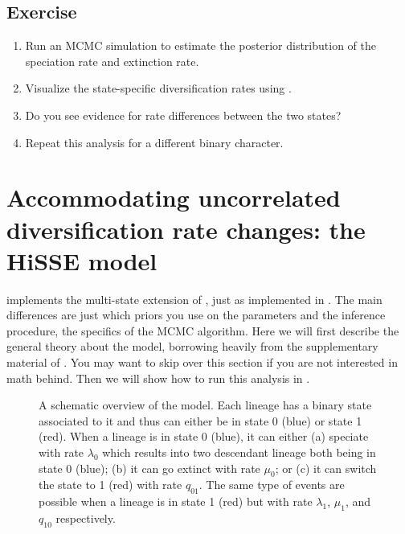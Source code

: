 


\subsection{Exercise}

\begin{enumerate}
\item Run an MCMC simulation to estimate the posterior distribution of the speciation rate and extinction rate.
\item Visualize the state-specific diversification rates using \R.
\item Do you see evidence for rate differences between the two states?
\item Repeat this analysis for a different binary character.
\end{enumerate}


\bigskip
\section{Accommodating uncorrelated diversification rate changes: the HiSSE model}\label{sec:HiSSE_Theory}

\RevBayes implements the multi-state extension of \BiSSE, just as implemented in \diversitree. 
The main differences are just which priors you use on the parameters and the inference procedure, \IE the specifics of the MCMC algorithm.
Here we will first describe the general theory about the model, borrowing heavily from the supplementary material of \cite{Moore2016}.
You may want to skip over this section if you are not interested in math behind.
Then we will show how to run this analysis in \RevBayes.
\begin{figure}[h!]
\centering
{}
\caption{\small A schematic overview of the \HiSSE model. Each lineage has a binary state associated to it and thus can either be in state 0 (blue) or state 1 (red). When a lineage is in state 0 (blue), it can either (a) speciate with rate $\lambda_0$ which results into two descendant lineage both being in state 0 (blue); (b) it can go extinct with rate $\mu_0$; or (c) it can switch the state to 1 (red) with rate $q_{01}$. The same type of events are possible when a lineage is in state 1 (red) but with rate $\lambda_1$, $\mu_1$, and $q_{10}$ respectively.}
\label{fig:HiSSE_Schematic}
\end{figure}



